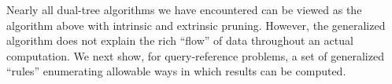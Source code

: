 \documentclass[twoside,leqno,twocolumn]{article}
\begin{document}
Nearly all dual-tree algorithms we have encountered can be viewed as the algorithm above with intrinsic and extrinsic pruning.
However, the generalized algorithm does not explain the rich ``flow'' of data throughout an actual computation.
We next show, for query-reference problems, a set of generalized ``rules'' enumerating allowable ways in which results can be computed.




\end{document}
